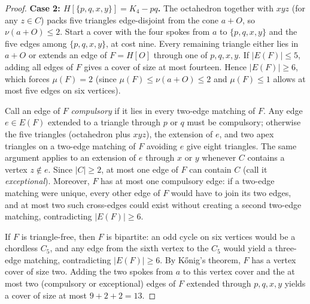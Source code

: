 \documentclass[11pt]{article}
\begin{document}
\begin{proof}
\medskip
\noindent\textbf{Case 2: $H[\{p,q,x,y\}]=K_4-pq$.}
The octahedron together with $xyz$ (for any $z\in C$) packs five triangles edge-disjoint from the cone $a+O$, so $\nu(a+O)\leq 2$. Start a cover with the four spokes from $a$ to $\{p,q,x,y\}$ and the five edges among $\{p,q,x,y\}$, at cost nine. Every remaining triangle either lies in $a+O$ or extends an edge of $F=H[O]$ through one of $p,q,x,y$. If $|E(F)|\leq 5$, adding all edges of $F$ gives a cover of size at most fourteen. Hence $|E(F)|\geq 6$, which forces $\mu(F)=2$ (since $\mu(F)\leq\nu(a+O)\leq 2$ and $\mu(F)\leq 1$ allows at most five edges on six vertices).

Call an edge of $F$ \emph{compulsory} if it lies in every two-edge matching of $F$. Any edge $e\in E(F)$ extended to a triangle through $p$ or $q$ must be compulsory; otherwise the five triangles (octahedron plus $xyz$), the extension of $e$, and two apex triangles on a two-edge matching of $F$ avoiding $e$ give eight triangles. The same argument applies to an extension of $e$ through $x$ or $y$ whenever $C$ contains a vertex $z\notin e$. Since $|C|\geq 2$, at most one edge of $F$ can contain $C$ (call it \emph{exceptional}). Moreover, $F$ has at most one compulsory edge: if a two-edge matching were unique, every other edge of $F$ would have to join its two edges, and at most two such cross-edges could exist without creating a second two-edge matching, contradicting $|E(F)|\geq 6$.

If $F$ is triangle-free, then $F$ is bipartite: an odd cycle on six vertices would be a chordless $C_5$, and any edge from the sixth vertex to the $C_5$ would yield a three-edge matching, contradicting $|E(F)|\geq 6$. By K\H{o}nig's theorem, $F$ has a vertex cover of size two. Adding the two spokes from $a$ to this vertex cover and the at most two (compulsory or exceptional) edges of $F$ extended through $p,q,x,y$ yields a cover of size at most $9+2+2=13$.


\end{proof}
\end{document}
